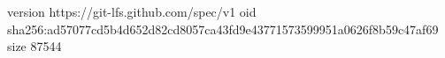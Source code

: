 version https://git-lfs.github.com/spec/v1
oid sha256:ad57077cd5b4d652d82cd8057ca43fd9e43771573599951a0626f8b59c47af69
size 87544
